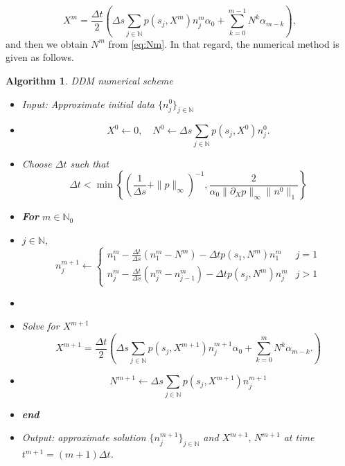 \documentclass[11pt,a4paper]{article}
\newcommand{\N}{\mathbb{N}}
\newtheorem{Alg}{Algorithm}[section]
\begin{document}
\begin{equation}\label{eq:findX}
    X^m=\frac{\Delta t}{2} \left( \Delta s \sum_{j\in\N}p(s_j,X^m)n_j^m \alpha_0 + \sum_{k=0}^{m-1} N^k\alpha_{m-k} \right),
\end{equation}
and then we obtain $N^m$ from \eqref{eq:Nm}. In that regard, the numerical method is given as follows.

\begin{Alg}{DDM numerical scheme }\label{Alg2}
 \begin{itemize}
 \item[] {Input: Approximate initial data $\{n_j^0\}_{j\in\N}$}
 \item[] \begin{equation*}
    X^0\leftarrow 0,\quad N^{0}\leftarrow \Delta s \sum_{j\in\N} p(s_j,X^0)n_j^{0}.  
 \end{equation*}
 \item[] Choose $\Delta t$ such that 
 \begin{equation}
 \label{CFL2}
      \Delta t < \min\left\{\left(\frac{1}{\Delta s}+\|p\|_\infty\right)^{-1},\frac{2}{\alpha_0\|\partial_Xp\|_{\infty}\|n^0\|_1}\right\}
 \end{equation}
 \item[] {\bf For} $m\in\N_0$
 \item[] \hspace{0.5cm}{\bf Do} $j\in\N$, 
    \begin{equation*}
    n_j^{m+1} \leftarrow
    \begin{cases}
      n_1^m-\frac{\Delta t}{\Delta s}(n_{1}^m-N^m)-\Delta t p(s_1,N^m)n_1^m & j=1\\
      n_j^m-\frac{\Delta t}{\Delta s}(n_{j}^m-n_{j-1}^m)-\Delta t p(s_j,N^m)n_j^m & j>1
     \end{cases}
    \end{equation*}
 \item[] \hspace{0.5cm}{\bf end} 
 \item[] \hspace{0.5cm} Solve for $X^{m+1}$ 
 \begin{equation}\label{eqfijo-X}
     X^{m+1}=\frac{\Delta t}{2} \left( \Delta s \sum_{j\in\N}p(s_j,X^{m+1})n_j^{m+1} \alpha_0 + \sum_{k=0}^{m} N^k\alpha_{m-k}. \right)
 \end{equation}
 \item[]
 \begin{equation*}
    N^{m+1}\leftarrow \Delta s \sum_{j\in\N} p(s_j,X^{m+1} )n_j^{m+1} 
 \end{equation*}
 \item[] {\bf end} 
 \item[] { Output:  approximate solution $\{n_j^{m+1}\}_{j\in\N}$  and $X^{m+1},\,N^{m+1}$ at time $t^{m+1}=(m+1)\Delta t$}.
 \end{itemize} 
\end{Alg}
\end{document}
